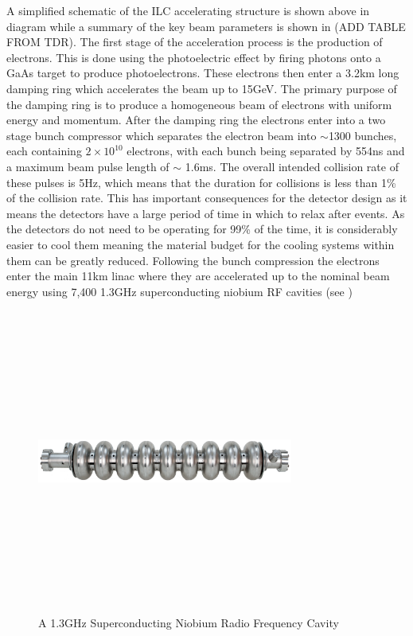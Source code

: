 A simplified schematic of the \ac{ILC} accelerating structure is shown above in diagram  while a summary of the key beam parameters is shown in (ADD TABLE FROM TDR). The first stage of the acceleration process is the production of electrons. This is done using the photoelectric effect by firing photons onto a GaAs target to produce photoelectrons. These electrons then enter a 3.2km long damping ring which accelerates the beam up to 15GeV. The primary purpose of the damping ring is to produce a homogeneous beam of electrons with uniform energy and momentum. After the damping ring the electrons enter into a two stage bunch compressor which separates the electron beam into ${\sim}$1300 bunches, each containing ${2\times10^{10}}$ electrons, with each bunch being separated by 554ns and a maximum beam pulse length of $\sim$ 1.6ms. The overall intended collision rate of these pulses is 5Hz, which means that the duration for collisions is less than 1\% of the collision rate. This has important consequences for the detector design as it means the detectors have a large period of time in which to relax after events. As the detectors do not need to be operating for 99\% of the time, it is considerably easier to cool them meaning the material budget for the cooling systems within them can be greatly reduced. Following the bunch compression the electrons enter the main 11km linac where they are accelerated up to the nominal beam energy using 7,400 1.3GHz superconducting niobium \ac{RF} cavities (see ) 

\begin{figure}
  \centering
  \includegraphics[width=0.75\textwidth,height=10cm,keepaspectratio]{Experiments/fig/Cavity}
  \caption[Superconducting Cavities For The ILC]{A 1.3GHz Superconducting Niobium Radio Frequency Cavity \cite{ILCTDR}}
  \label{Fig:cavity}
\end{figure}

